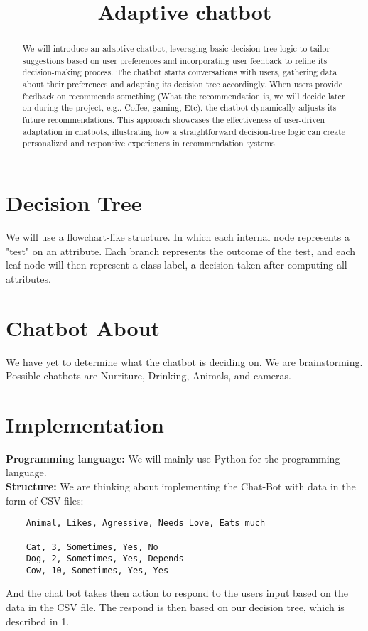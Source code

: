 \documentclass{article}
\title{Adaptive chatbot}
\begin{document}
\maketitle


\begin{abstract}
   We will introduce an adaptive chatbot, leveraging basic decision-tree logic to tailor suggestions based on user preferences and incorporating user feedback to refine its decision-making process. The chatbot starts conversations with users, gathering data about their preferences and adapting its decision tree accordingly. When users provide feedback on recommends something (What the recommendation is, we will decide later on during the project, e.g., Coffee, gaming, Etc), the chatbot dynamically adjusts its future recommendations. This approach showcases the effectiveness of user-driven adaptation in chatbots, illustrating how a straightforward decision-tree logic can create personalized and responsive experiences in recommendation systems.
\end{abstract}


\section{Decision Tree}
We will use a flowchart-like structure. In which each internal node represents a "test" on an attribute. Each branch represents the outcome of the test, and each leaf node will then represent a class label, a decision taken after computing all attributes.

\section{Chatbot About}
We have yet to determine what the chatbot is deciding on. We are brainstorming. Possible chatbots are Nurriture, Drinking, Animals, and cameras.

\section{Implementation}
\textbf{Programming language:} We will mainly use Python for the programming language.\bigskip \\
\textbf{Structure:} We are thinking about implementing the Chat-Bot with data in the form of CSV files: 
\begin{verbatim}
    Animal, Likes, Agressive, Needs Love, Eats much
    
    Cat, 3, Sometimes, Yes, No
    Dog, 2, Sometimes, Yes, Depends 
    Cow, 10, Sometimes, Yes, Yes
\end{verbatim}
And the chat bot takes then action to respond to the users input based on the data in the CSV file. The respond is then based on our decision tree, which is described in 1.
\end{document}
